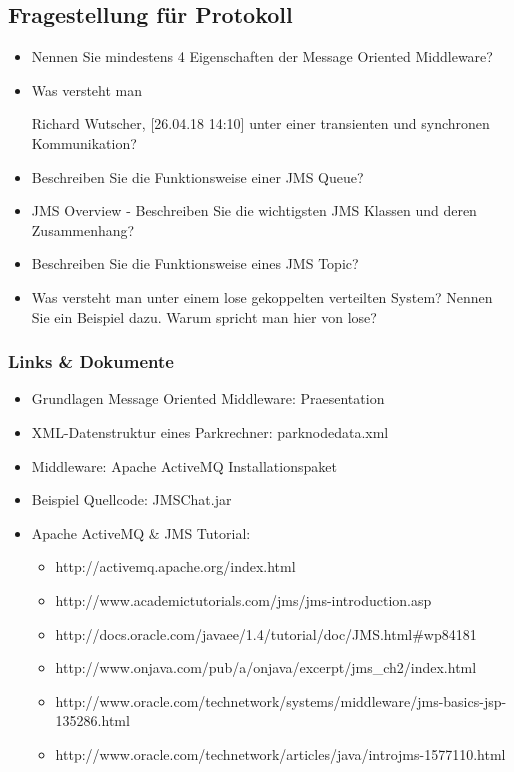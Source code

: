 \subsection{Fragestellung für Protokoll}

\begin{itemize}
    \item Nennen Sie mindestens 4 Eigenschaften der Message Oriented Middleware?
    \item Was versteht man

Richard Wutscher, [26.04.18 14:10]
unter einer transienten und synchronen Kommunikation?
    \item Beschreiben Sie die Funktionsweise einer JMS Queue?
    \item JMS Overview - Beschreiben Sie die wichtigsten JMS Klassen und deren Zusammenhang?
    \item Beschreiben Sie die Funktionsweise eines JMS Topic?
    \item Was versteht man unter einem lose gekoppelten verteilten System? Nennen Sie ein Beispiel dazu. Warum spricht man hier von lose?
\end{itemize}

\subsubsection{Links \& Dokumente}

\begin{itemize}
    \item Grundlagen Message Oriented Middleware: Praesentation
        \item XML-Datenstruktur eines Parkrechner: parknodedata.xml
        \item Middleware: Apache ActiveMQ Installationspaket
        \item Beispiel Quellcode: JMSChat.jar
        \item Apache ActiveMQ \& JMS Tutorial:

    \begin{itemize}
        \item http://activemq.apache.org/index.html
        \item http://www.academictutorials.com/jms/jms-introduction.asp
        \item http://docs.oracle.com/javaee/1.4/tutorial/doc/JMS.html\#wp84181
        \item http://www.onjava.com/pub/a/onjava/excerpt/jms\_ch2/index.html
        \item http://www.oracle.com/technetwork/systems/middleware/jms-basics-jsp-135286.html
        \item http://www.oracle.com/technetwork/articles/java/introjms-1577110.html
    \end{itemize}
\end{itemize}

